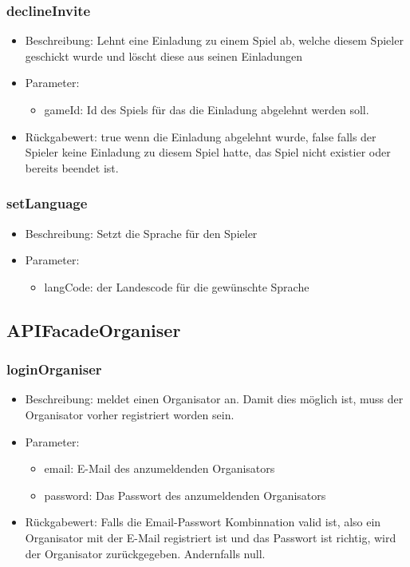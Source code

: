 \documentclass[a4paper]{scrreprt}
\begin{document}
    \subsubsection{declineInvite}
    \begin{itemize}
        \item Beschreibung: Lehnt eine Einladung zu einem Spiel ab, welche diesem Spieler geschickt wurde und löscht diese aus seinen Einladungen
        \item Parameter:
        \begin{itemize}
            \item gameId: Id des Spiels für das die Einladung abgelehnt werden soll.
        \end{itemize}
        \item Rückgabewert: true wenn die Einladung abgelehnt wurde, false falls der Spieler keine Einladung zu diesem Spiel hatte, das Spiel nicht existier oder bereits beendet ist. 
    \end{itemize}
    \subsubsection{setLanguage}
    \begin{itemize}
        \item Beschreibung: Setzt die Sprache für den Spieler
        \item Parameter:
        \begin{itemize}
            \item langCode: der Landescode für die gewünschte Sprache
        \end{itemize}
    \end{itemize}
    \subsection{APIFacadeOrganiser}
    \subsubsection{loginOrganiser}
    \begin{itemize}
        \item Beschreibung: meldet einen Organisator an. Damit dies möglich ist, muss der Organisator vorher registriert worden sein.
        \item Parameter:
        \begin{itemize}
            \item email: E-Mail des anzumeldenden Organisators
            \item password: Das Passwort des anzumeldenden Organisators
        \end{itemize}
        \item Rückgabewert: Falls die Email-Passwort Kombinnation valid ist, also ein Organisator mit der E-Mail registriert ist und das Passwort ist richtig, wird der Organisator zurückgegeben. Andernfalls null. 
    \end{itemize}
\end{document}
